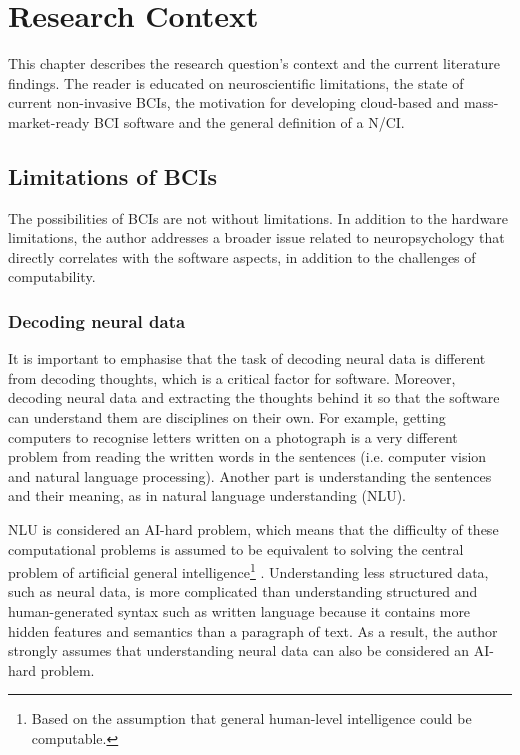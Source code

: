 \chapter{Research Context}
\graphicspath{{Chapter2/Figs/}{Chapter2/Figs/}}

This chapter describes the research question's context and the current literature findings. The reader is educated on neuroscientific limitations, the state of current non-invasive BCIs, the motivation for developing cloud-based and mass-market-ready BCI software and the general definition of a N/CI.

\section{Limitations of BCIs}
\label{chapter2-limitations-of-bcis}

The possibilities of BCIs are not without limitations. In addition to the hardware limitations, the author addresses a broader issue related to neuropsychology that directly correlates with the software aspects, in addition to the challenges of computability.

\subsection{Decoding neural data}
\label{chapter2-decoding-neural-data}

It is important to emphasise that the task of decoding neural data is different from decoding thoughts, which is a critical factor for software. Moreover, decoding neural data and extracting the thoughts behind it so that the software can understand them are disciplines on their own. For example, getting computers to recognise letters written on a photograph is a very different problem from reading the written words in the sentences (i.e. computer vision and natural language processing). Another part is understanding the sentences and their meaning, as in natural language understanding (NLU).

NLU is considered an AI-hard problem, which means that the difficulty of these computational problems is assumed to be equivalent to solving the central problem of artificial general intelligence\footnote{Based on the assumption that general human-level intelligence could be computable.} \citep{demasi_theoretical_2010}. Understanding less structured data, such as neural data, is more complicated than understanding structured and human-generated syntax such as written language because it contains more hidden features and semantics than a paragraph of text. As a result, the author strongly assumes that understanding neural data can also be considered an AI-hard problem.

